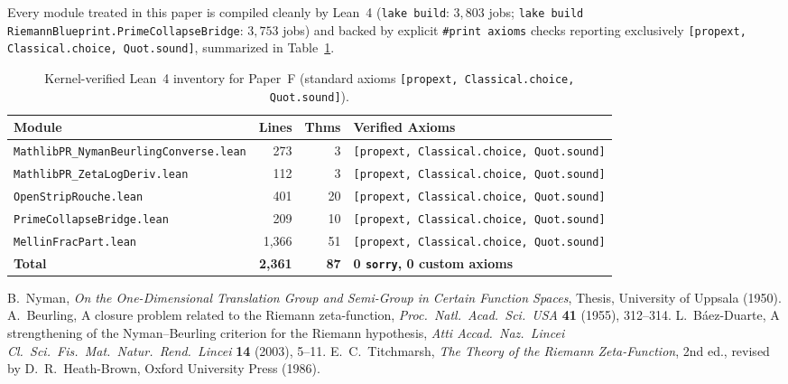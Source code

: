 \documentclass[11pt,a4paper]{article}
\theoremstyle{definition}
\begin{document}
Every module treated in this paper is compiled cleanly by Lean~4 (\texttt{lake build}: $3{,}803$ jobs; \texttt{lake build RiemannBlueprint.\allowbreak PrimeCollapseBridge}: $3{,}753$ jobs) and backed by explicit \texttt{\#print axioms} checks reporting exclusively \texttt{[propext, Classical.choice, Quot.sound]}, summarized in Table~\ref{tab:paper_f_audit}.

\begin{table}[h!]
\centering
\footnotesize
\setlength{\tabcolsep}{4pt}
\begin{tabular}{@{}lrrl@{}}
\toprule
\textbf{Module} & \textbf{Lines} & \textbf{Thms} & \textbf{Verified Axioms} \\
\midrule
\texttt{MathlibPR\_NymanBeurlingConverse.lean} & 273 & 3 & \texttt{[propext, Classical.choice, Quot.sound]} \\
\texttt{MathlibPR\_ZetaLogDeriv.lean} & 112 & 3 & \texttt{[propext, Classical.choice, Quot.sound]} \\
\texttt{OpenStripRouche.lean} & 401 & 20 & \texttt{[propext, Classical.choice, Quot.sound]} \\
\texttt{PrimeCollapseBridge.lean} & 209 & 10 & \texttt{[propext, Classical.choice, Quot.sound]} \\
\texttt{MellinFracPart.lean} & 1,366 & 51 & \texttt{[propext, Classical.choice, Quot.sound]} \\
\midrule
\textbf{Total} & \textbf{2,361} & \textbf{87} & \textbf{0 \texttt{sorry}, 0 custom axioms} \\
\bottomrule
\end{tabular}
\caption{Kernel-verified Lean~4 inventory for Paper~F (standard axioms \texttt{[propext, Classical.choice, Quot.sound]}).}
\label{tab:paper_f_audit}
\end{table}

\begin{thebibliography}{9}
 B.~Nyman, \emph{On the One-Dimensional Translation Group and Semi-Group in Certain Function Spaces}, Thesis, University of Uppsala (1950).
 A.~Beurling, A closure problem related to the Riemann zeta-function, \emph{Proc.\ Natl.\ Acad.\ Sci.\ USA} \textbf{41} (1955), 312--314.
 L.~B\'aez-Duarte, A strengthening of the Nyman--Beurling criterion for the Riemann hypothesis, \emph{Atti Accad.\ Naz.\ Lincei Cl.\ Sci.\ Fis.\ Mat.\ Natur.\ Rend.\ Lincei} \textbf{14} (2003), 5--11.
 E.~C.~Titchmarsh, \emph{The Theory of the Riemann Zeta-Function}, 2nd ed., revised by D.~R.~Heath-Brown, Oxford University Press (1986).
\end{thebibliography}
\end{document}
